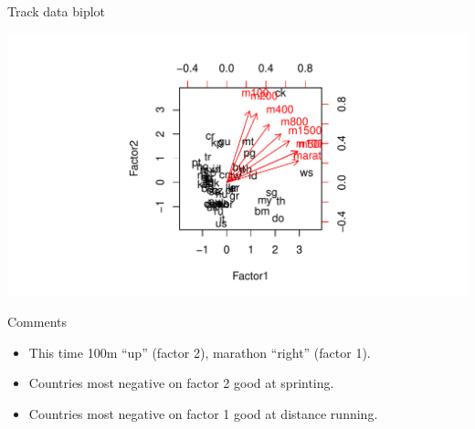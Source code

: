 \begin{frame}[fragile]{Track data biplot}
  
\begin{knitrout}
\color{fgcolor}\begin{kframe}
\begin{alltt}
\hlopt{$}\hlopt{$}\hlstd{=track[,}\hlstd{])}
\end{alltt}
\end{kframe}
\includegraphics[width=\maxwidth]{figure/siracusa-1} 

\end{knitrout}
  
  
\end{frame}

\begin{frame}[fragile]{Comments}
  
  \begin{itemize}
  \item This time 100m ``up'' (factor 2), marathon ``right'' (factor 1).
  \item Countries most negative on factor 2 good at sprinting.
  \item Countries most negative on factor 1 good at distance running.
  \end{itemize}
  
\end{frame}


